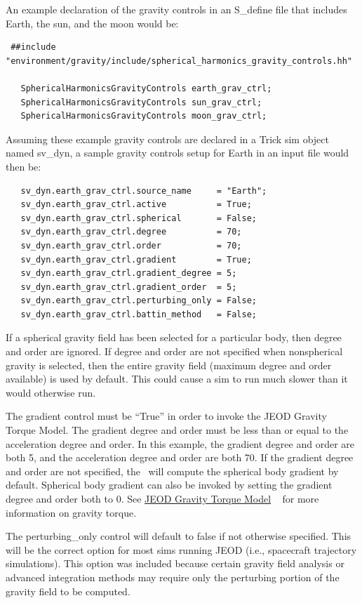 An example declaration of the gravity controls in an S\_define file that
includes Earth, the sun, and the moon would be:
\begin{verbatim}
 ##include "environment/gravity/include/spherical_harmonics_gravity_controls.hh"

   SphericalHarmonicsGravityControls earth_grav_ctrl;
   SphericalHarmonicsGravityControls sun_grav_ctrl;
   SphericalHarmonicsGravityControls moon_grav_ctrl;
\end{verbatim}

Assuming these example gravity controls are declared in a Trick sim object
named sv\_dyn, a sample gravity controls setup for Earth in an input file
would then be:
\begin{verbatim}
   sv_dyn.earth_grav_ctrl.source_name     = "Earth";
   sv_dyn.earth_grav_ctrl.active          = True;
   sv_dyn.earth_grav_ctrl.spherical       = False;
   sv_dyn.earth_grav_ctrl.degree          = 70;
   sv_dyn.earth_grav_ctrl.order           = 70;
   sv_dyn.earth_grav_ctrl.gradient        = True;
   sv_dyn.earth_grav_ctrl.gradient_degree = 5;
   sv_dyn.earth_grav_ctrl.gradient_order  = 5;
   sv_dyn.earth_grav_ctrl.perturbing_only = False;
   sv_dyn.earth_grav_ctrl.battin_method   = False;
\end{verbatim}

If a spherical gravity field has been selected for a particular body, then
degree and order are ignored. If degree and order are not specified when
nonspherical gravity is selected, then the entire gravity field (maximum
degree and order available) is used by default.  This could cause a sim to run
much slower than it would otherwise run.  

The gradient control must be ``True'' in order to invoke the JEOD Gravity Torque
Model. The gradient degree and order must be less than or equal to the
acceleration degree and order. In this example, the gradient degree and order
are both 5, and the acceleration degree and order are both 70. If the gradient
degree and order are not specified, the \ModelDesc\ will compute the
spherical body gradient by default. Spherical body gradient can also be invoked
by setting the gradient degree and order both to 0. See  
\hyperref{file:\JEODHOME/models/interactions/gravity_torque/docs/gravity_torque.pdf}{part1}{reqt}
{JEOD Gravity Torque Model} ~\cite{dynenv:gravitytorque} for more information on
gravity torque.

The perturbing\_only control will default to false if not otherwise specified.
This will be the correct option for most sims running JEOD (i.e., spacecraft
trajectory simulations). This option was included because certain gravity field
analysis or advanced integration methods may require only the perturbing 
portion of the gravity field to be computed.

